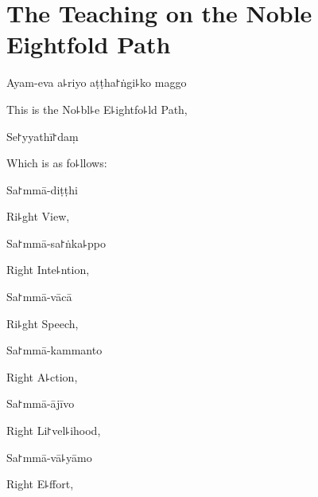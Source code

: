 
\chapter[The Noble Eightfold Path]{The Teaching on the Noble Eightfold Path}%



\begin{leader}
\end{leader}

Ayam-eva a꜕riyo aṭṭha꜓ṅgi꜕ko maggo

\begin{english}
  This is the No꜕bl꜕e E꜕ightfo꜕ld Path,
\end{english}

Se꜓yyathī꜓daṃ

\begin{english}
  Which is as fo꜕llows:
\end{english}

Sa꜓mmā-diṭṭhi

\begin{english}
  Ri꜕ght View,
\end{english}

Sa꜓mmā-sa꜓ṅka꜕ppo

\begin{english}
  Right Inte꜕ntion,
\end{english}

Sa꜓mmā-vācā

\begin{english}
  Ri꜕ght Speech,
\end{english}

Sa꜓mmā-kammanto

\begin{english}
  Right A꜕ction,
\end{english}

Sa꜓mmā-ājīvo

\begin{english}
  Right Li꜓vel꜕ihood,
\end{english}

Sa꜓mmā-vā꜕yāmo

\begin{english}
  Right E꜕ffort,
\end{english}

